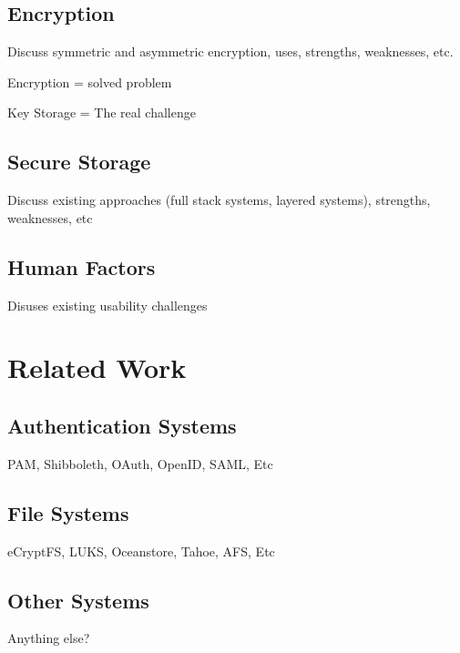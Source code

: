 \subsection{Encryption}

Discuss symmetric and asymmetric encryption, uses, strengths,
weaknesses, etc.

Encryption = solved problem

Key Storage = The real challenge

\subsection{Secure Storage}

Discuss existing approaches (full stack systems, layered systems),
strengths, weaknesses, etc

\subsection{Human Factors}

Disuses existing usability challenges

\section{Related Work}

\subsection{Authentication Systems}

PAM, Shibboleth, OAuth, OpenID, SAML, Etc

\subsection{File Systems}

eCryptFS, LUKS, Oceanstore, Tahoe, AFS, Etc

\subsection{Other Systems}

Anything else?
